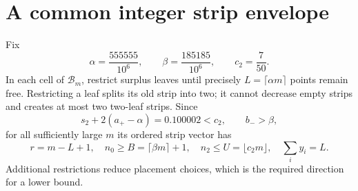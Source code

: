 \documentclass[11pt]{amsart}
\numberwithin{equation}{section}
\theoremstyle{remark}\newtheorem{remark}[theorem]{Remark}
\begin{document}
\section{A common integer strip envelope}
Fix
\[
 \alpha=\frac{555555}{10^6},\qquad
 \beta=\frac{185185}{10^6},\qquad c_2=\frac7{50}.
\]
In each cell of $\mathcal B_m$, restrict surplus leaves until precisely $L=\lceil\alpha m\rceil$ points remain free. Restricting a leaf splits its old strip into two; it cannot decrease empty strips and creates at most two two-leaf strips. Since
\[
 s_2+2(a_+-\alpha)=0.100002<c_2,\qquad b_->\beta,
\]
for all sufficiently large $m$ its ordered strip vector has
\begin{equation}\label{eq:bounds}
 r=m-L+1,\quad n_0\geq B=\lceil\beta m\rceil+1,\quad
 n_2\leq U=\lfloor c_2m\rfloor,\quad\sum_i y_i=L.
\end{equation}
Additional restrictions reduce placement choices, which is the required direction for a lower bound.
\end{document}
